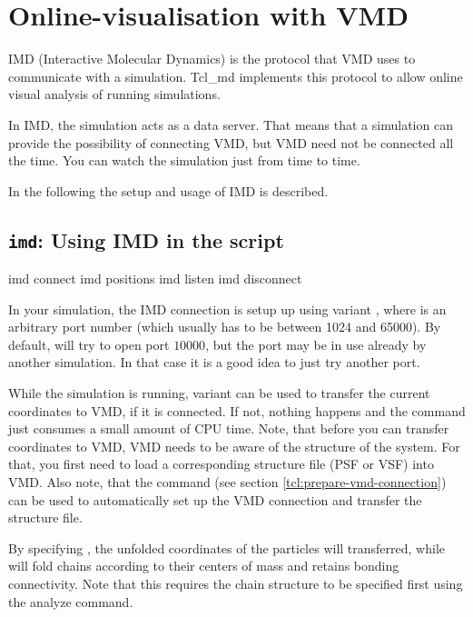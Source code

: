 \section{Online-visualisation with VMD}
\label{sec:IMD}

IMD (Interactive Molecular Dynamics) is the protocol that VMD uses to
communicate with a simulation. Tcl\_md implements this protocol to
allow online visual analysis of running simulations.

In IMD, the simulation acts as a data server. That means that a
simulation can provide the possibility of connecting VMD, but VMD need
not be connected all the time. You can watch the simulation just from
time to time.

In the following the setup and usage of IMD is described.

\subsection{\texttt{imd}: Using IMD in the script}

\begin{essyntax}
   imd connect 
   imd positions 
   imd listen 
   imd disconnect
\end{essyntax}

In your simulation, the IMD connection is setup up using variant
, where  is an arbitrary port number (which
usually has to be between 1024 and 65000). By default, \es will try to
open port $10000$, but the port may be in use already by another \es
simulation. In that case it is a good idea to just try another port.

While the simulation is running, variant  can be used to
transfer the current coordinates to VMD, if it is connected.  If not,
nothing happens and the command just consumes a small amount of CPU
time. Note, that before you can transfer coordinates to VMD, VMD needs
to be aware of the structure of the system. For that, you first need
to load a corresponding structure file (PSF or VSF) into VMD. Also
note, that the command  (see section
\vref{tcl:prepare-vmd-connection}) can be used to automatically set up
the VMD connection and transfer the structure file.

By specifying , the unfolded coordinates of the
particles will transferred, while  will fold chains
according to their centers of mass and retains bonding connectivity.
Note that this requires the chain structure to be specified first
using the analyze command.

